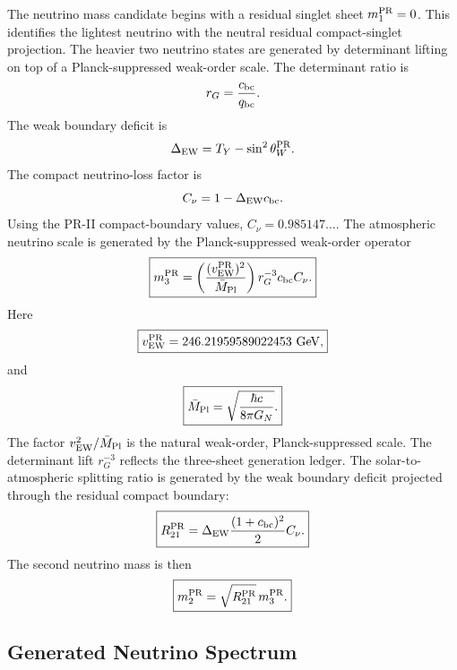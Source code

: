 \documentclass[11pt]{article}
\begin{document}
The neutrino mass candidate begins with a residual singlet sheet $m_1^{\rm PR}=0$. This identifies the lightest neutrino with the neutral residual compact-singlet projection. The heavier two neutrino states are generated by determinant lifting on top of a Planck-suppressed weak-order scale. The determinant ratio is
\begin{equation}
r_G
=
\frac{c_{\rm bc}}{q_{\rm bc}}.
\end{equation}
The weak boundary deficit is
\begin{equation}
\Delta_{\rm EW}
=
T_Y-\sin^2\theta_W^{\rm PR}.
\end{equation}
The compact neutrino-loss factor is
\begin{equation}
C_\nu
=
1-\Delta_{\rm EW}c_{\rm bc}.
\end{equation}
Using the PR-II compact-boundary values, $C_\nu=0.985147\ldots$. The atmospheric neutrino scale is generated by the Planck-suppressed weak-order operator
\begin{equation}
\boxed{
m_3^{\rm PR}
=
\left(
\frac{
(v_{\rm EW}^{\rm PR})^2
}{
\bar M_{\rm Pl}
}
\right)
r_G^{-3}
c_{\rm bc}
C_\nu.
}
\end{equation}
Here
\begin{equation}
\boxed{
v_{\rm EW}^{\rm PR}
=
246.21959589022453\ {\rm GeV},
}
\end{equation}
and
\begin{equation}
\boxed{
\bar M_{\rm Pl}
=
\sqrt{
\frac{\hbar c}{8\pi G_N}
}.
}
\end{equation}
The factor \(v_{\rm EW}^2/\bar M_{\rm Pl}\) is the natural weak-order, Planck-suppressed scale. The determinant lift \(r_G^{-3}\) reflects the three-sheet generation ledger. The solar-to-atmospheric splitting ratio is generated by the weak boundary deficit projected through the residual compact boundary:
\begin{equation}
\boxed{
R_{21}^{\rm PR}
=
\Delta_{\rm EW}
\frac{
(1+c_{\rm bc})^2
}{2}
C_\nu.
}
\end{equation}
The second neutrino mass is then
\begin{equation}
\boxed{
m_2^{\rm PR}
=
\sqrt{
R_{21}^{\rm PR}
}\,
m_3^{\rm PR}.
}
\end{equation}

\subsection{Generated Neutrino Spectrum}
\label{sec:pr2_generated_neutrino_spectrum}
\end{document}
